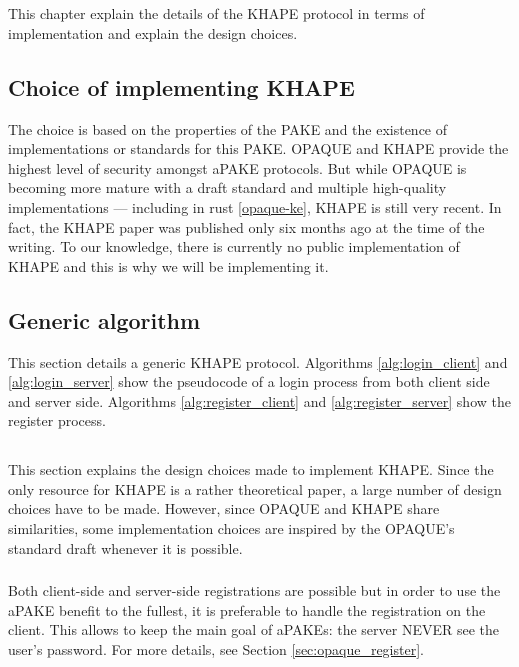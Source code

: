 ﻿\documentclass[../report.tex]{subfiles}
\begin{document}
\chapter{} \label{cha:khape}
This chapter explain the details of the KHAPE protocol in terms of implementation and explain the design choices.
\section{Choice of implementing KHAPE}
The choice is based on the properties of the PAKE and the existence of implementations or standards for this PAKE.
OPAQUE and KHAPE provide the highest level of security amongst aPAKE protocols.
But while OPAQUE is becoming more mature with a draft standard and multiple high-quality implementations --- including in rust \ref{opaque-ke}, KHAPE is still very recent.
In fact, the KHAPE paper was published only six months ago at the time of the writing. To our knowledge, there is currently no public implementation of KHAPE and this is why we will be implementing it.


\section{Generic algorithm} \label{sec:khape_generic_algo}
This section details a generic KHAPE protocol.
Algorithms \ref{alg:login_client} and \ref{alg:login_server} show the pseudocode of a login process from both client side and server side. Algorithms \ref{alg:register_client} and \ref{alg:register_server} show the register process.


\section{}
This section explains the design choices made to implement KHAPE.
Since the only resource for KHAPE is a rather theoretical paper, a large number of  design choices have to be made. However, since OPAQUE and KHAPE share similarities, some implementation choices are inspired by the OPAQUE's standard draft whenever it is possible.


\subsection{}
Both client-side and server-side registrations are possible but in order to use the aPAKE benefit to the fullest, it is preferable to handle the registration on the client.
This allows to keep the main goal of aPAKEs: the server NEVER see the user's password.
For more details, see Section \ref{sec:opaque_register}.
\end{document}
